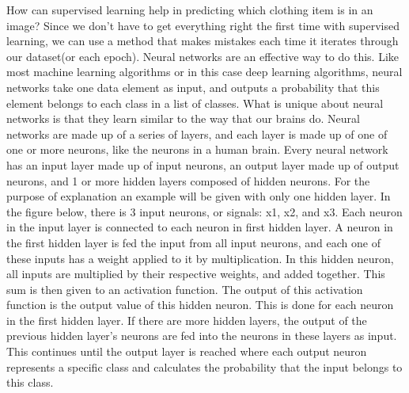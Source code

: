 \documentclass[12pt]{article} %
\begin{document}
	How can supervised learning help in predicting which clothing item is in an image? Since we don't have to get everything right the first time with supervised learning, we can use a method that makes mistakes each time it iterates through our dataset(or each epoch). Neural networks are an effective way to do this. Like most machine learning algorithms or in this case deep learning algorithms, neural networks take one data element as input, and outputs a probability that this element belongs to each class in a list of classes. What is unique about neural networks is that they learn similar to the way that our brains do. Neural networks are made up of a series of layers, and each layer is made up of one of one or more neurons, like the neurons in a human brain. Every neural network has an input layer made up of input neurons, an output layer made up of output neurons, and 1 or more hidden layers composed of hidden neurons. For the purpose of explanation an example will be given with only one hidden layer. In the figure below, there is 3 input neurons, or signals: x1, x2, and x3. Each neuron in the input layer is connected to each neuron in first hidden layer. A neuron in the first hidden layer is fed the input from all input neurons, and each one of these inputs has a weight applied to it by multiplication. In this hidden neuron, all inputs are multiplied by their respective weights, and added together. This sum is then given to an activation function. The output of this activation function is the output value of this hidden neuron. This is done for each neuron in the first hidden layer. If there are more hidden layers, the output of the previous hidden layer's neurons are fed into the neurons in these layers as input. This continues until the output layer is reached where each output neuron represents a specific class and calculates the probability that the input belongs to this class.\cite{KubatMachineLearn}
	
\end{document}
